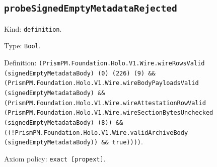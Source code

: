 \documentclass[11pt]{article}
\begin{document}
\subsection*{\texttt{probeSignedEmptyMetadataRejected}}
\noindent Kind: \texttt{definition}.\par
\noindent Type: \texttt{Bool}.\par
\noindent Definition: \texttt{(PrismPM.Foundation.Holo.V1.Wire.wireRowsValid (signedEmptyMetadataBody) (0) (226) (9) \&\& (PrismPM.Foundation.Holo.V1.Wire.wireBodyPayloadsValid (signedEmptyMetadataBody) \&\& (PrismPM.Foundation.Holo.V1.Wire.wireAttestationRowValid (PrismPM.Foundation.Holo.V1.Wire.wireSectionBytesUnchecked (signedEmptyMetadataBody) (8)) \&\& ((!PrismPM.Foundation.Holo.V1.Wire.validArchiveBody (signedEmptyMetadataBody)) \&\& true))))}.\par
\noindent Axiom policy: \texttt{exact [propext]}.\par
\end{document}

